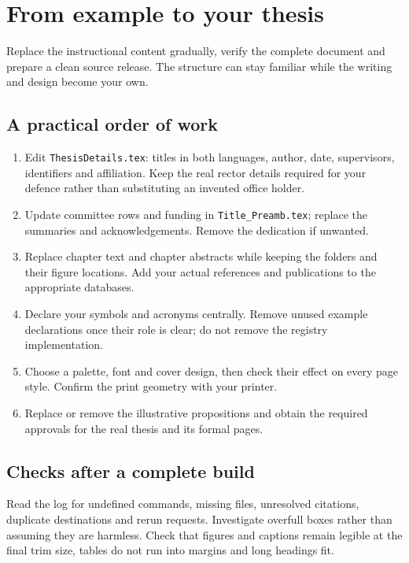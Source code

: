 
\chapter{From example to your thesis}\label{chap:08}
\renewcommand{\FigLocation}{Chapters/Chapter_8/fig/}
\renewcommand{\ChapLocation}{Chapters/Chapter_8/}
\begin{absbox}
Replace the instructional content gradually, verify the complete document and prepare a clean source release. The structure can stay familiar while the writing and design become your own.
\end{absbox}

\section{A practical order of work}
\begin{enumerate}[itemsep=5pt]
\item Edit \texttt{ThesisDetails.tex}: titles in both languages, author, date,
supervisors, identifiers and affiliation. Keep the real rector details required
for your defence rather than substituting an invented office holder.
\item Update committee rows and funding in \texttt{Title\_Preamb.tex}; replace
the summaries and acknowledgements. Remove the dedication if unwanted.
\item Replace chapter text and chapter abstracts while keeping the folders and
their figure locations. Add your actual references and publications to the
appropriate databases.
\item Declare your symbols and acronyms centrally. Remove unused example
declarations once their role is clear; do not remove the registry implementation.
\item Choose a palette, font and cover design, then check their effect on every
page style. Confirm the print geometry with your printer.
\item Replace or remove the illustrative propositions and obtain the required
approvals for the real thesis and its formal pages.
\end{enumerate}

\section{Checks after a complete build}
Read the log for undefined commands, missing files, unresolved citations,
duplicate destinations and rerun requests. Investigate overfull boxes rather
than assuming they are harmless. Check that figures and captions remain legible
at the final trim size, tables do not run into margins and long headings fit.

